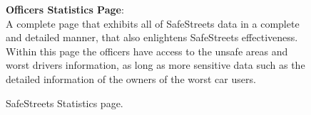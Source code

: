 \begin{figure}
	\begin{flushleft}
		\textbf{Officers Statistics Page}:\\
		A complete page that exhibits all of SafeStreets data in a complete and detailed manner, that also enlightens SafeStreets effectiveness. Within this page the officers have access to the unsafe areas and worst drivers information, as long as more sensitive data such as the detailed information of the owners of the worst car users.
	\end{flushleft}
	\centering
	\caption{SafeStreets Statistics page.}
	\label{fig:statistics2}
\end{figure}
\clearpage
